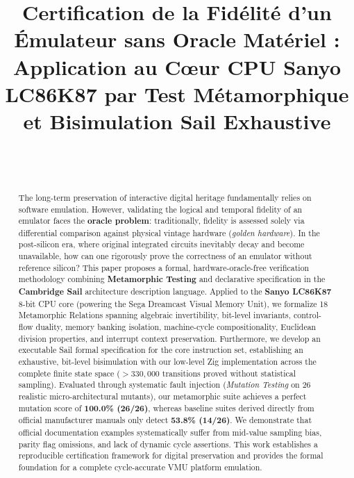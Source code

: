 \documentclass[10pt,journal,compsoc]{IEEEtran}
\begin{document}
\title{Certification de la Fidélité d'un Émulateur sans Oracle Matériel :\\
\large Application au Cœur CPU Sanyo LC86K87 par Test Métamorphique et Bisimulation Sail Exhaustive}

\author{
     \\
     \\
}

\maketitle

\begin{abstract}
The long-term preservation of interactive digital heritage fundamentally relies on software emulation. However, validating the logical and temporal fidelity of an emulator faces the \textbf{oracle problem}: traditionally, fidelity is assessed solely via differential comparison against physical vintage hardware (\textit{golden hardware}). In the post-silicon era, where original integrated circuits inevitably decay and become unavailable, how can one rigorously prove the correctness of an emulator without reference silicon? 
This paper proposes a formal, hardware-oracle-free verification methodology combining \textbf{Metamorphic Testing} and declarative specification in the \textbf{Cambridge Sail} architecture description language. Applied to the \textbf{Sanyo LC86K87} 8-bit CPU core (powering the Sega Dreamcast Visual Memory Unit), we formalize 18 Metamorphic Relations spanning algebraic invertibility, bit-level invariants, control-flow duality, memory banking isolation, machine-cycle compositionality, Euclidean division properties, and interrupt context preservation. Furthermore, we develop an executable Sail formal specification for the core instruction set, establishing an exhaustive, bit-level bisimulation with our low-level Zig implementation across the complete finite state space ($>330,000$ transitions proved without statistical sampling). Evaluated through systematic fault injection (\textit{Mutation Testing} on 26 realistic micro-architectural mutants), our metamorphic suite achieves a perfect mutation score of \textbf{100.0\% (26/26)}, whereas baseline suites derived directly from official manufacturer manuals only detect \textbf{53.8\% (14/26)}. We demonstrate that official documentation examples systematically suffer from mid-value sampling bias, parity flag omissions, and lack of dynamic cycle assertions. This work establishes a reproducible certification framework for digital preservation and provides the formal foundation for a complete cycle-accurate VMU platform emulation.
\end{abstract}
\end{document}
